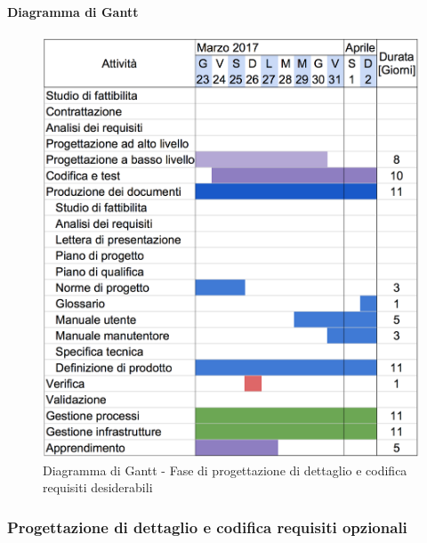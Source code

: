 		\paragraph{Diagramma di Gantt}
		\begin{figure}[H]
			\centering
			\includegraphics[height=0.45\textheight]{img/Gantt/f4c.png}
			\caption{Diagramma di Gantt - Fase di progettazione di dettaglio e codifica requisiti desiderabili}
		\end{figure}
	\subsubsection {Progettazione di dettaglio e codifica requisiti opzionali}
